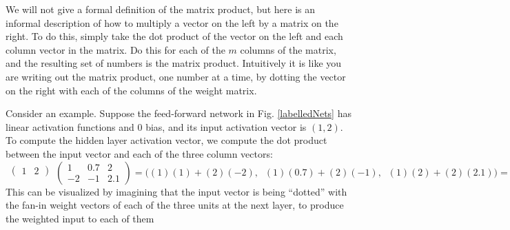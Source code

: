 We will not give a formal definition of the matrix product, but here is an informal description of how to multiply a vector on the left by a matrix on the right. To do this, simply take the dot product of the vector on the left and each column vector in the  matrix. Do this for each of the $m$ columns of the matrix, and the resulting set of numbers is the matrix product. Intuitively it is like you are writing out the matrix product, one number at a time, by dotting the vector on the right with each of the columns of the weight matrix.

Consider an example. Suppose the feed-forward network in Fig. \ref{labelledNets} has linear activation functions and 0 bias, and its input activation vector is $(1,2)$. To compute the hidden layer activation vector, we compute the dot product between the input vector and each of the three column vectors:
\[
  \begin{matrix}\begin{pmatrix}1 & 2\end{pmatrix}\\\mbox{}\end{matrix}
  \begin{pmatrix} 1 & 0.7 & 2 \\ -2 & -1 & 2.1 \end{pmatrix} 
  =
  \bigg( (1)(1) + (2)(-2) ,\;\; (1)(0.7) + (2)(-1) ,\;\; (1)(2)+ (2)(2.1) \bigg)
  =
  \begin{pmatrix}  -3 \;\; -1.3 \;\;\; 6.2  \end{pmatrix}
\]
This can be visualized by imagining that the input vector is being ``dotted'' with the fan-in weight vectors of each of the three units at the next layer, to produce the weighted input to each of them 


